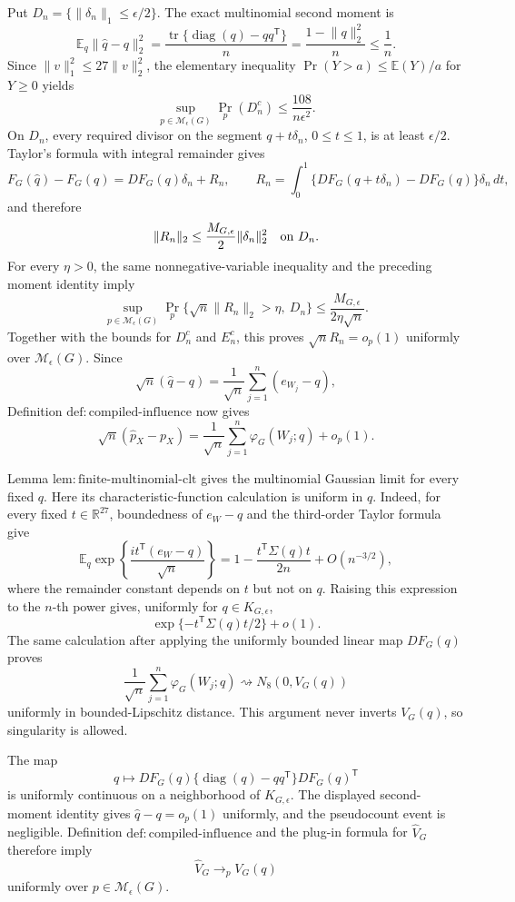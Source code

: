 Put \(D_n=\{\lVert\delta_n\rVert_1\leq\epsilon/2\}\). The exact multinomial second moment is
\[
\mathbb E_q\lVert\widehat q-q\rVert_2^2
=\frac{\operatorname{tr}\{\operatorname{diag}(q)-qq^{\mathsf T}\}}{n}
=\frac{1-\lVert q\rVert_2^2}{n}\leq\frac1n.
\]
Since \(\lVert v\rVert_1^2\leq27\lVert v\rVert_2^2\), the elementary inequality \(\Pr(Y>a)\leq\mathbb E(Y)/a\) for \(Y\geq0\) yields
\[
\sup_{p\in\mathcal M_\epsilon(G)}\Pr_p(D_n^c)
\leq\frac{108}{n\epsilon^2}.
\]
On \(D_n\), every required divisor on the segment \(q+t\delta_n\), \(0\leq t\leq1\), is at least \(\epsilon/2\). Taylor's formula with integral remainder gives
\[
F_G(\widehat q)-F_G(q)=D F_G(q)\delta_n+R_n,
\qquad
R_n=\int_0^1\{D F_G(q+t\delta_n)-D F_G(q)\}\delta_n\,dt,
\]
and therefore
\[
\lVert R_n\rVert_2\leq\frac{M_{G,\epsilon}}2\lVert\delta_n\rVert_2^2
\quad\hbox{on }D_n.
\]
For every \(\eta>0\), the same nonnegative-variable inequality and the preceding moment identity imply
\[
\sup_{p\in\mathcal M_\epsilon(G)}
\Pr_p\{\sqrt n\lVert R_n\rVert_2>\eta,\ D_n\}
\leq\frac{M_{G,\epsilon}}{2\eta\sqrt n}.
\]
Together with the bounds for \(D_n^c\) and \(E_n^c\), this proves \(\sqrt nR_n=o_p(1)\) uniformly over \(\mathcal M_\epsilon(G)\). Since
\[
\sqrt n(\widehat q-q)=\frac1{\sqrt n}\sum_{j=1}^n(e_{W_j}-q),
\]
Definition \(\mathrm{def{:}compiled\text{-}influence}\) now gives
\[
\sqrt n(\widehat p_X-p_X)
=\frac1{\sqrt n}\sum_{j=1}^n\varphi_G(W_j;q)+o_p(1).
\]

Lemma \(\mathrm{lem{:}finite\text{-}multinomial\text{-}clt}\) gives the multinomial Gaussian limit for every fixed \(q\). Here its characteristic-function calculation is uniform in \(q\). Indeed, for every fixed \(t\in\mathbb R^{27}\), boundedness of \(e_W-q\) and the third-order Taylor formula give
\[
\mathbb E_q\exp\!\left\{\frac{i t^{\mathsf T}(e_W-q)}{\sqrt n}\right\}
=1-\frac{t^{\mathsf T}\Sigma(q)t}{2n}+O(n^{-3/2}),
\]
where the remainder constant depends on \(t\) but not on \(q\). Raising this expression to the \(n\)-th power gives, uniformly for \(q\in K_{G,\epsilon}\),
\[
\exp\{-t^{\mathsf T}\Sigma(q)t/2\}+o(1).
\]
The same calculation after applying the uniformly bounded linear map \(D F_G(q)\) proves
\[
\frac1{\sqrt n}\sum_{j=1}^n\varphi_G(W_j;q)
\rightsquigarrow N_8(0,V_G(q))
\]
uniformly in bounded-Lipschitz distance. This argument never inverts \(V_G(q)\), so singularity is allowed.

The map
\[
q\longmapsto D F_G(q)\{\operatorname{diag}(q)-qq^{\mathsf T}\}D F_G(q)^{\mathsf T}
\]
is uniformly continuous on a neighborhood of \(K_{G,\epsilon}\). The displayed second-moment identity gives \(\widehat q-q=o_p(1)\) uniformly, and the pseudocount event is negligible. Definition \(\mathrm{def{:}compiled\text{-}influence}\) and the plug-in formula for \(\widehat V_G\) therefore imply
\[
\widehat V_G\longrightarrow_p V_G(q)
\]
uniformly over \(p\in\mathcal M_\epsilon(G)\).

